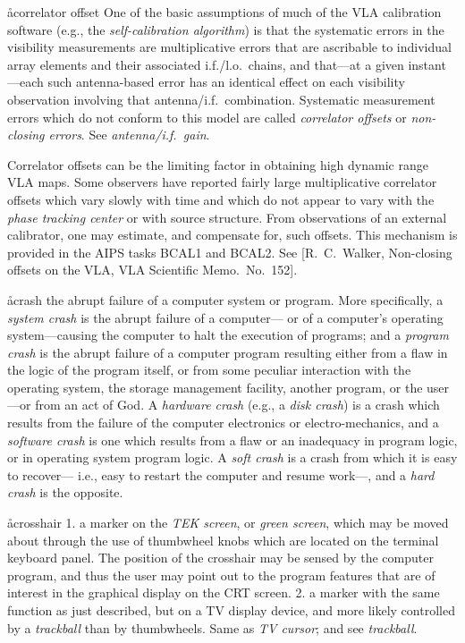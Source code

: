 \aa{correlator offset}
One of the basic assumptions of much of the VLA calibration software
(e.g., the {\it self-calibration algorithm}\/)
is that the systematic errors in the visibility measurements
are multiplicative errors that are ascribable to
individual array elements and their associated i.f./l.o.\ chains,
and that---at a given instant---each such antenna-based error
has an identical effect on each visibility observation involving
that antenna/i.f.\ combination.
Systematic measurement errors which do not conform to this model
are called {\it correlator offsets} or {\it non-closing errors}.
See {\it antenna/i.f.\ gain}.
\par
Correlator offsets can be the limiting factor in obtaining
high dynamic range VLA maps.
Some observers have reported fairly large multiplicative
correlator offsets which vary slowly with time
and which do not appear to vary with the {\it phase tracking center}
or with source structure.
From observations of an external calibrator,
one may estimate, and compensate for, such offsets.
This mechanism is provided in the AIPS tasks BCAL1 and BCAL2.
See [R.~C.~Walker, Non-closing offsets on the VLA,
VLA Scientific Memo.\ No.~152].

\aa{crash}
the abrupt failure of a computer system or program.
More specifically,
a {\it system crash} is the abrupt failure of a computer---%
or of a computer's operating system---causing the computer to halt
the execution of programs;
and a {\it program crash} is the abrupt failure of a computer
program resulting either from a flaw in the logic of the
program itself, or from some peculiar interaction
with the operating system, the storage management facility,
another program, or the user---or from an act of God.
A {\it hardware crash} (e.g., a {\it disk crash}\/)
is a crash which results from the failure
of the computer electronics or electro-mechanics,
and a {\it software crash} is one
which results from a flaw or an inadequacy in program logic,
or in operating system program logic.
A {\it soft crash} is a crash from which it is easy to recover---%
i.e., easy to restart the computer and resume work---,
and a {\it hard crash} is the opposite.

\aa{crosshair}
1. a marker on the {\it TEK screen}, or {\it green screen},
which may be moved about through the use of thumbwheel knobs which are
located on the terminal keyboard panel.
The position of the crosshair may be sensed by the computer
program, and thus the user may point out to the program
features that are of interest in the graphical display on the CRT
screen.
\xspace2. a marker with the same function as just described,
but on a TV display device, and more likely controlled by a {\it trackball}
than by thumbwheels.
Same as {\it TV cursor}\/; and see {\it trackball}.

